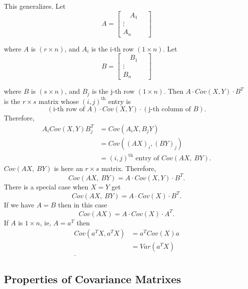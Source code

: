 This generalizes. Let 
\[
A = \begin{bmatrix} \quad A_1 \quad  \\ \vdots \\ A_n \end{bmatrix} 
\] 

where $A$ is $\left( r \times  n \right) $, and $A_i$ is the i-th row $\left( 1\times n \right) $. Let 
\[
B = \begin{bmatrix} \quad B_1 \quad  \\ \vdots \\ B_n \end{bmatrix} 
\] 

where $B$ is $\left( s \times  n \right) $, and $B_j$ is the j-th row $\left( 1\times n \right) $. Then $A \cdot Cov\left( X, Y \right) \cdot B^{T}$ is the $r \times  s$ matrix whose $\left( i, j \right) ^{\text{th}}$ entry is 
\[
	\left( \text{i-th row of }A \right) \cdot Cov\left( X, Y \right) \cdot\left( \text{j-th column of }B \right) 
.\] 
Therefore, 
\begin{align*}
	A_i Cov\left( X, Y \right) B_j ^{T} &= Cov\left( A_i X, B _j Y  \right) \\
					    &= Cov\left( \left( AX \right) _i , \left( BY \right) _j \right)  \\
					    &= \left( i , j  \right) ^{\text{th}} \text{ entry of }Cov\left( AX,\ BY \right) 
.\end{align*} 
$Cov\left( AX, \ BY \right) $ is here an $r \times s$ matrix. Therefore, 
\[
	Cov\left( AX, \ BY \right)  = A \cdot Cov\left( X, Y \right) \cdot B^{T}
.\]
There is a special case when $X = Y$ get 
\[
	Cov\left( AX, \ BY \right)  = A\cdot Cov\left( X \right) \cdot B^{T}
.\] 
If we have $A = B$ then in this case 
\[
	Cov\left( AX \right)  = A \cdot Cov\left( X \right) \cdot A^{T}
.\] 
If $A$ is $1 \times  n$, ie, $A = a^{T}$ then 
\begin{align*}
	Cov\left( a^{T}X, a^{T}X \right)  &=  a^{T}Cov\left( X \right) a \\
					  &= Var\left( a ^{T}X \right)  \\
.\end{align*}

\subsection{Properties of Covariance Matrixes}

